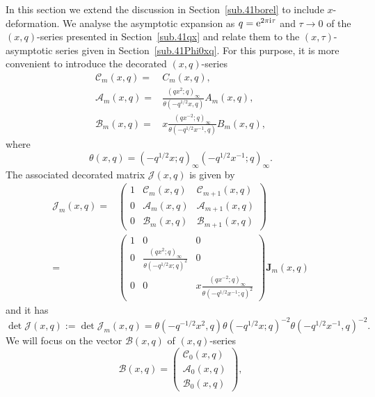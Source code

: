 \documentclass[12pt,reqno]{amsart}
\theoremstyle{definition}
\def\calJ{\mathcal J}
\def\th{\theta}
\def\ri{\mathrm{i}}
\def\re{{\rm e}}
\def\ri{{\rm i}}
\def\bJ{\mathbf J}
\def\mc{\mathcal}
\newcommand{\nn}{\nonumber \\}
\begin{document}
In this section we extend the discussion in Section~\ref{sub.41borel}
to include $x$-deformation. We analyse the asymptotic expansion as
$q = \re^{2\pi\ri\tau}$ and $\tau\rightarrow 0$ of the $(x,q)$-series
presented in Section~\ref{sub.41qx} and relate them to the
$(x,\tau)$-asymptotic series given in Section~\ref{sub.41Phi0xq}.  For
this purpose, it is more convenient to introduce the decorated
$(x,q)$-series
\begin{equation}
  \begin{aligned}
    \mc{C}_m(x,q) =
    &C_m(x,q),\\
    \mc{A}_m(x,q) =
    &\frac{(qx^2;q)_\infty}{\th(-q^{1/2}x,q)}A_m(x,q),\\
    \mc{B}_m(x,q) =
    &x\frac{(qx^{-2};q)_\infty}{\th(-q^{1/2}x^{-1},q)}B_m(x,q),
  \end{aligned}
\end{equation}
where
\begin{equation}
  \theta(x,q) = (-q^{1/2}x;q)_\infty(-q^{1/2}x^{-1};q)_\infty.
\end{equation}
The associated decorated matrix $\mc{J}(x,q)$ is given by
\begin{align}
  \calJ_{m}(x,q)
  =
  &\begin{pmatrix}
    1 & \mathcal{C}_{m}(x,q) & \mathcal{C}_{m+1}(x,q)\\
    0 & \mathcal{A}_{m}(x,q) & \mathcal{A}_{m+1}(x,q)\\
    0 & \mathcal{B}_{m}(x,q) & \mathcal{B}_{m+1}(x,q)
  \end{pmatrix}\nn
=
&\begin{pmatrix}
1 & 0 & 0\\
0 & \frac{(qx^{2};q)_{\infty}}{\theta(-q^{1/2}x;q)^{2}} & 0\\
0 & 0 & x\frac{(qx^{-2};q)_{\infty}}{\theta(-q^{1/2}x^{-1};q)^{2}}
\end{pmatrix}
\bJ_{m}(x,q)
\end{align}
and it has
\begin{equation}
  \det\mc{J}(x,q):= \det\mc{J}_m(x,q) = \theta(-q^{-1/2}x^2,q)
  \theta(-q^{1/2}x;q)^{-2}\theta(-q^{1/2}x^{-1},q)^{-2}.
\end{equation}
%
We will focus on the vector $\mc{B}(x,q)$
of $(x,q)$-series 
\begin{equation}
  \mc{B}(x,q) =
  \begin{pmatrix}
    \mc{C}_0(x,q)\\
    \mc{A}_0(x,q)\\
    \mc{B}_0(x,q)
  \end{pmatrix},
\end{equation}
\end{document}
